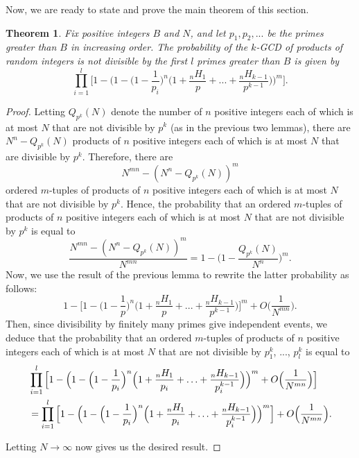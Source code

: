\documentclass[12pt]{amsart}
\newtheorem{theorem}{Theorem}[subsection]
\theoremstyle{definition}
\begin{document}
Now, we are ready to state and prove the main theorem of this section.

\begin{theorem}
	Fix positive integers $B$ and $N$, and let $p_1, p_2, ...$ be the primes greater than $B$ in increasing order. The probability of the $k$-GCD of products of random integers is not divisible by the first $l$ primes greater than $B$ is given by 
	$$\prod_{i=1}^{l} \Big[1 - \Big(1 - \Big(1-\frac{1}{p_i}\Big)^n \Big(1 + \frac{{}_nH_1}{p} + ... + \frac{{}_nH_{k-1}}{p^{k-1}}\Big)\Big)^m\Big].$$
\end{theorem}

\begin{proof}
	Letting $Q_{p^k}(N)$ denote the number of $n$ positive integers each of which is at most $N$ that are not divisible by $p^k$ (as in the previous two lemmas), there are $N^n - Q_{p^k}(N)$ products of $n$ positive integers each of which is at most $N$ that are divisible by $p^k$. Therefore, there are 
	$$N^{mn} - (N^n - Q_{p^k}(N))^m$$
	ordered $m$-tuples of products of $n$ positive integers each of which is at most $N$ that are not divisible by $p^k$.
	Hence, the probability that an ordered $m$-tuples of products of $n$ positive integers each of which is at most $N$ that are not divisible by $p^k$ is equal to
	$$\frac{N^{mn} - (N^n - Q_{p^k}(N))^m}{N^{mn}} = 1 - \Big(1 - \frac{Q_{p^k}(N)}{N^n}\Big)^m.$$
	Now, we use the result of the previous lemma to rewrite the latter probability as follows:
	$$1 - \Big[1 - \Big(1 - \frac{1}{p}\Big)^n \Big(1 + \frac{{}_nH_1}{p} + ... + \frac{{}_nH_{k-1}}{p^{k-1}}\Big)\Big]^m + O\Big(\frac{1}{N^{mn}}\Big).$$
	Then, since divisibility by finitely many primes give independent events, we deduce that the probability that an ordered $m$-tuples of products of $n$ positive integers each of which is at most $N$ that are not divisible by $p_1^k$, ..., $p_l^k$ is equal to
	\begin{align*} &\prod_{i=1}^l \Big[1 - \Big(1 -\Big(1-\frac{1}{p_i}\Big)^n\Big(1+\frac{{}_nH_1}{p_i}+\mathellipsis+\frac{{}_nH_{k-1}}{p_i^{k-1}}\Big)\Big)^m +O\Big(\frac{1}{N^{mn}}\Big) \Big]\\
		&=\prod_{i=1}^l \Big[1 - \Big(1 -\Big(1-\frac{1}{p_i}\Big)^n\Big(1+\frac{{}_nH_1}{p_i}+\mathellipsis+\frac{{}_nH_{k-1}}{p_i^{k-1}}\Big)\Big)^m\Big] + O\Big(\frac{1}{N^{mn}}\Big). \end{align*}
	
	\noindent Letting $N \to \infty$ now gives us the desired result.
\end{proof}
\end{document}
